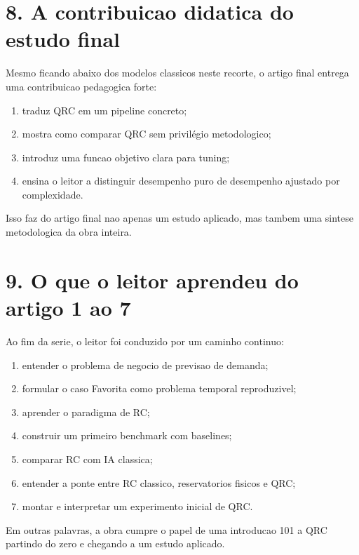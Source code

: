 \documentclass[12pt]{article}
\providecommand{\tightlist}{%
  \setlength{\itemsep}{0pt}\setlength{\parskip}{0pt}}
\begin{document}
\section{8. A contribuicao didatica do estudo final}\label{8-a-contribuicao-didatica-do-estudo-final}

Mesmo ficando abaixo dos modelos classicos neste recorte, o artigo final entrega uma contribuicao pedagogica forte:

\begin{enumerate}
\def\labelenumi{\arabic{enumi}.}
\tightlist
\item
  traduz QRC em um pipeline concreto;
\item
  mostra como comparar QRC sem privilégio metodologico;
\item
  introduz uma funcao objetivo clara para tuning;
\item
  ensina o leitor a distinguir desempenho puro de desempenho ajustado por complexidade.
\end{enumerate}

Isso faz do artigo final nao apenas um estudo aplicado, mas tambem uma sintese metodologica da obra inteira.

\section{9. O que o leitor aprendeu do artigo 1 ao 7}\label{9-o-que-o-leitor-aprendeu-do-artigo-1-ao-7}

Ao fim da serie, o leitor foi conduzido por um caminho continuo:

\begin{enumerate}
\def\labelenumi{\arabic{enumi}.}
\tightlist
\item
  entender o problema de negocio de previsao de demanda;
\item
  formular o caso Favorita como problema temporal reproduzivel;
\item
  aprender o paradigma de RC;
\item
  construir um primeiro benchmark com baselines;
\item
  comparar RC com IA classica;
\item
  entender a ponte entre RC classico, reservatorios fisicos e QRC;
\item
  montar e interpretar um experimento inicial de QRC.
\end{enumerate}

Em outras palavras, a obra cumpre o papel de uma introducao 101 a QRC partindo do zero e chegando a um estudo aplicado.
\end{document}
